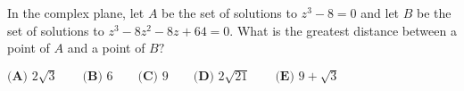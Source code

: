In the complex plane, let $A$ be the set of solutions to $z^3 - 8 = 0$ and let $B$ be the set of solutions to $z^3 - 8z^2 - 8z + 64 = 0$. What is the greatest distance between a point of $A$ and a point of $B?$

$\textbf{(A) } 2\sqrt{3} \qquad \textbf{(B) } 6 \qquad \textbf{(C) } 9 \qquad \textbf{(D) } 2\sqrt{21} \qquad \textbf{(E) } 9 + \sqrt{3}$